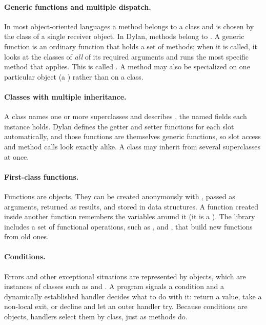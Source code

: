 \paragraph{Generic functions and multiple dispatch.}
In most object-oriented languages a method belongs to a class and is
chosen by the class of a single receiver object. In Dylan, methods belong
to . A generic function is an ordinary function
that holds a set of methods; when it is called, it looks at the classes of
\emph{all} of its required arguments and runs the most specific method that
applies. This is called . A method may also be
specialized on one particular object (a ) rather than on a
class.

\paragraph{Classes with multiple inheritance.} A class names one or more
superclasses and describes , the named fields each instance
holds. Dylan defines the getter and setter functions for each slot
automatically, and those functions are themselves generic functions, so
slot access and method calls look exactly alike. A class may inherit from
several superclasses at once.

\paragraph{First-class functions.} Functions are objects. They can be
created anonymously with , passed as arguments, returned as
results, and stored in data structures. A function created inside another
function remembers the variables around it (it is a ). The
library includes a set of functional operations, such as ,
 and , that build new functions from old
ones.

\paragraph{Conditions.} Errors and other exceptional situations are
represented by  objects, which are instances of classes
such as  and . A program signals a condition
and a dynamically established handler decides what to do with it: return
a value, take a non-local exit, or decline and let an outer handler try.
Because conditions are objects, handlers select them by class, just as
methods do.

